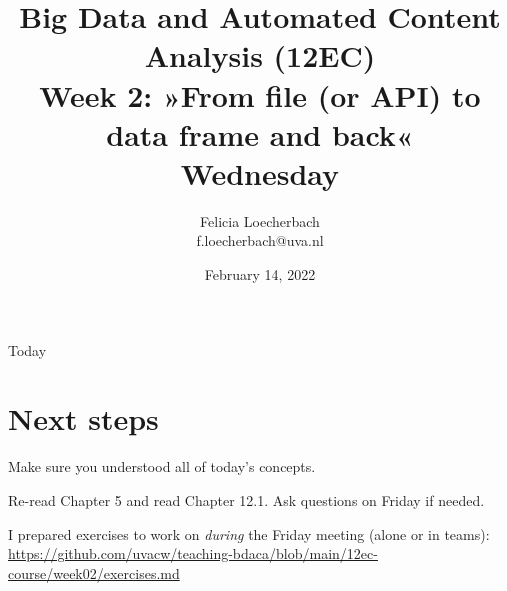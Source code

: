 \documentclass[compress]{beamer}
\begin{document}
\title[Big Data and Automated Content Analysis]{\textbf{Big Data and Automated Content Analysis (12EC)} 
\\Week 2: »From file (or API) to data frame and back«
\\Wednesday}
\author[Felicia Loecherbach]{Felicia Loecherbach\\ \footnotesize{f.loecherbach@uva.nl\\}}
\date{February 14, 2022}


\begin{frame}{}
	\titlepage
\end{frame}

\begin{frame}{Today}
	\tableofcontents
\end{frame}



	










\section{Next steps}




\begin{frame}[standout]
Make sure you understood all of today's concepts.

Re-read Chapter 5 and read Chapter 12.1. Ask questions on Friday if needed.

I prepared exercises to work on \emph{during} the Friday meeting (alone or in teams):
\large{\url{https://github.com/uvacw/teaching-bdaca/blob/main/12ec-course/week02/exercises.md}}
\end{frame}





\begin{frame}
	\printbibliography
\end{frame}
\end{document}

